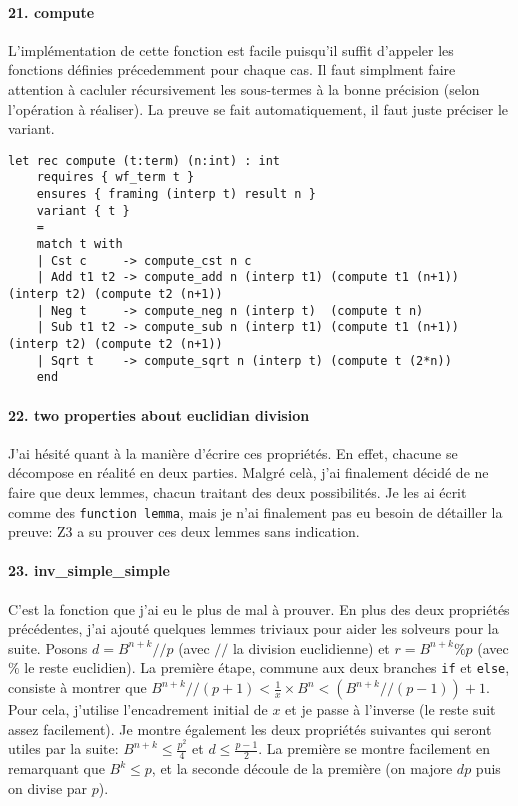 \documentclass[a4paper]{article}%
\begin{document}
	\paragraph{21. compute} L'implémentation de cette fonction est facile puisqu'il suffit d'appeler les fonctions
	définies précedemment pour chaque cas. Il faut simplment faire attention à cacluler récursivement les sous-termes
	à la bonne précision (selon l'opération à réaliser). La preuve se fait automatiquement, il faut juste préciser le variant.
	\begin{verbatim}
let rec compute (t:term) (n:int) : int
	requires { wf_term t }
	ensures { framing (interp t) result n }
	variant { t }
	=
	match t with
	| Cst c     -> compute_cst n c
	| Add t1 t2 -> compute_add n (interp t1) (compute t1 (n+1)) (interp t2) (compute t2 (n+1))
	| Neg t     -> compute_neg n (interp t)  (compute t n)
	| Sub t1 t2 -> compute_sub n (interp t1) (compute t1 (n+1)) (interp t2) (compute t2 (n+1))
	| Sqrt t    -> compute_sqrt n (interp t) (compute t (2*n))
	end
	\end{verbatim}

	\paragraph{22. two properties about euclidian division } J'ai hésité quant à la manière d'écrire ces propriétés.
	En effet, chacune se décompose en réalité en deux parties. Malgré celà, j'ai finalement décidé de ne faire que deux lemmes,
	chacun traitant des deux possibilités. Je les ai écrit comme des \texttt{function lemma}, mais je n'ai finalement
	pas eu besoin de détailler la preuve: Z3 a su prouver ces deux lemmes sans indication.

	\paragraph{23. inv\_simple\_simple} C'est la fonction que j'ai eu le plus de mal à prouver. En plus des deux propriétés précédentes,
	j'ai ajouté quelques lemmes triviaux pour aider les solveurs pour la suite.
	Posons $d = B^{n+k} // p$ (avec $//$ la division euclidienne) et $r = B^{n+k} \% p$ (avec $\%$ le reste euclidien).
	La première étape, commune aux deux branches \texttt{if} et \texttt{else},
	consiste à montrer que $B^{n+k} // (p+1) < \frac{1}{x} \times B^n < (B^{n+k} // (p-1)) + 1$.
	Pour cela, j'utilise l'encadrement initial de $x$ et je passe à l'inverse (le reste suit assez facilement).
	Je montre également les deux propriétés suivantes qui seront utiles par la suite: $B^{n+k} \leq \frac{p^2}{4}$
	et $d \leq \frac{p-1}{2}$. La première se montre facilement en remarquant que $B^k \leq p$, et la seconde découle
	de la première (on majore $dp$ puis on divise par $p$).\\
\end{document}
